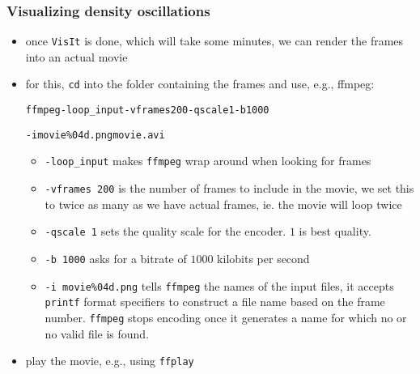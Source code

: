 \begin{frame}
\frametitle{Visualizing density oscillations}
\begin{itemize}
\item once \texttt{VisIt} is done, which will take some minutes, we can render the frames into an actual movie
\item for this, \texttt{cd} into the folder containing the frames and use, e.g., ffmpeg:
\begin{alltt}
ffmpeg -loop\_input -vframes 200 -qscale 1 -b 1000

-i movie\%04d.png movie.avi
\end{alltt}
\begin{itemize}
\item \texttt{-loop\_input} makes \texttt{ffmpeg} wrap around when looking for frames
\item \texttt{-vframes 200} is the number of frames to include in the movie, we set this to twice as many as we have actual frames, ie. the movie will loop twice
\item \texttt{-qscale 1} sets the quality scale for the encoder. $1$ is best quality.
\item \texttt{-b 1000} asks for a bitrate of $1000$ kilobits per second
\item \texttt{-i movie\%04d.png} tells \texttt{ffmpeg} the names of the input files, it accepts \texttt{printf} format specifiers to construct a file name based on the frame number. \texttt{ffmpeg} stops encoding once it generates a name for which no or no valid file is found.
\end{itemize}
\item play the movie, e.g., using \texttt{ffplay}
\end{itemize}
\end{frame}




